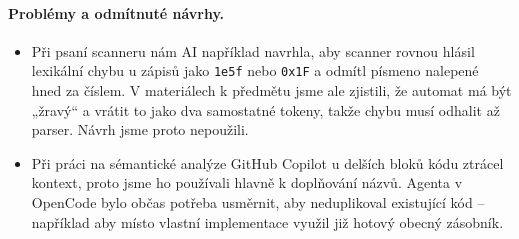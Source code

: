 \documentclass[a4paper,11pt]{article}
\begin{document}
\paragraph{Problémy a odmítnuté návrhy.}




\begin{itemize}
  \item Při psaní scanneru nám AI například navrhla, aby scanner rovnou hlásil lexikální chybu u zápisů
jako \texttt{1e5f} nebo \texttt{0x1F} a odmítl písmeno nalepené hned za číslem.
V materiálech k předmětu jsme ale zjistili, že automat má být „žravý“ a vrátit
to jako dva samostatné tokeny, takže chybu musí odhalit až parser. Návrh jsme
proto nepoužili.
  \item Při práci na sémantické analýze GitHub Copilot u delších bloků kódu ztrácel
kontext, proto jsme ho používali hlavně k doplňování názvů. Agenta
v OpenCode bylo občas potřeba usměrnit, aby neduplikoval existující kód --
například aby místo vlastní implementace využil již hotový obecný zásobník.
\end{itemize}
\end{document}
